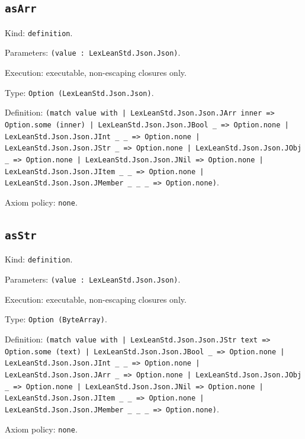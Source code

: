 \documentclass[11pt]{article}
\begin{document}
\subsection*{\texttt{asArr}}
\noindent Kind: \texttt{definition}.\par
\noindent Parameters: \texttt{(value : LexLeanStd.Json.Json)}.\par
\noindent Execution: executable, non-escaping closures only.\par
\noindent Type: \texttt{Option (LexLeanStd.Json.Json)}.\par
\noindent Definition: \texttt{(match value with | LexLeanStd.Json.Json.JArr inner => Option.some (inner) | LexLeanStd.Json.Json.JBool \_ => Option.none | LexLeanStd.Json.Json.JInt \_ \_ => Option.none | LexLeanStd.Json.Json.JStr \_ => Option.none | LexLeanStd.Json.Json.JObj \_ => Option.none | LexLeanStd.Json.Json.JNil => Option.none | LexLeanStd.Json.Json.JItem \_ \_ => Option.none | LexLeanStd.Json.Json.JMember \_ \_ \_ => Option.none)}.\par
\noindent Axiom policy: \texttt{none}.\par
\subsection*{\texttt{asStr}}
\noindent Kind: \texttt{definition}.\par
\noindent Parameters: \texttt{(value : LexLeanStd.Json.Json)}.\par
\noindent Execution: executable, non-escaping closures only.\par
\noindent Type: \texttt{Option (ByteArray)}.\par
\noindent Definition: \texttt{(match value with | LexLeanStd.Json.Json.JStr text => Option.some (text) | LexLeanStd.Json.Json.JBool \_ => Option.none | LexLeanStd.Json.Json.JInt \_ \_ => Option.none | LexLeanStd.Json.Json.JArr \_ => Option.none | LexLeanStd.Json.Json.JObj \_ => Option.none | LexLeanStd.Json.Json.JNil => Option.none | LexLeanStd.Json.Json.JItem \_ \_ => Option.none | LexLeanStd.Json.Json.JMember \_ \_ \_ => Option.none)}.\par
\noindent Axiom policy: \texttt{none}.\par
\end{document}
